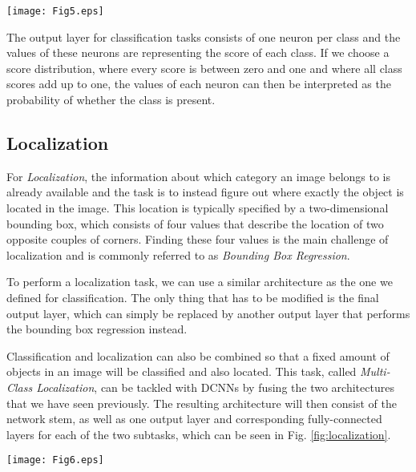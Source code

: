 \documentclass[conference]{IEEEtran}
\begin{document}
\begin{figure*}
\texttt{[image: Fig5.eps]}
\caption{The default DCNN architecture for image classification. Multiple convolutional and pooling layers first extract abstract features, which are forwarded to a classifier by fully-connected layers}
\label{fig:classification}
\end{figure*}

The output layer for classification tasks consists of one neuron per class and the values of these neurons are representing the score of each class. If we choose a score distribution, where every score is between zero and one and where all class scores add up to one, the values of each neuron can then be interpreted as the probability of whether the class is present.


\subsection{Localization}\label{subsec:localization}
For \emph{Localization}, the information about which category an image belongs to is already available and the task is to instead figure out where exactly the object is located in the image. This location is typically specified by a two-dimensional bounding box, which consists of four values that describe the location of two opposite couples of corners. Finding these four values is the main challenge of localization and is commonly referred to as \emph{Bounding Box Regression}.

To perform a localization task, we can use a similar architecture as the one we defined for classification. The only thing that has to be modified is the final output layer, which can simply be replaced by another output layer that performs the bounding box regression instead.

Classification and localization can also be combined so that a fixed amount of objects in an image will be classified and also located. This task, called \emph{Multi-Class Localization}, can be tackled with DCNNs by fusing the two architectures that we have seen previously. The resulting architecture will then consist of the network stem, as well as one output layer and corresponding fully-connected layers for each of the two subtasks, which can be seen in Fig. \ref{fig:localization}.

\begin{figure*}
\texttt{[image: Fig6.eps]}
\caption{A DCNN architecture for multi-class localization. The extracted features of the convolutional and pooling layers in the network stem are used to simultaneously locate the object by bounding box regression and classify it}
\label{fig:localization}
\end{figure*}
\end{document}
